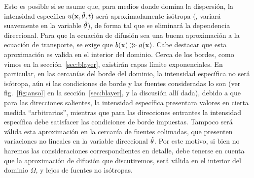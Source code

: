 Esto es posible si se asume que, para medios donde domina la dispersión, 
la intensidad específica $u(\mathbf{x},\hat{\theta},t)$ será aproximadamente 
isótropa (\ie, variará suavemente en la variable $\hat{\theta}$), 
de forma tal que se eliminará la dependencia direccional. Para que la 
ecuación de difusión sea una buena aproximación a la ecuación de 
transporte, se exige que $b(\mathbf{x})\gg a(\mathbf{x})$. Cabe destacar que esta aproximación 
es valida en el interior del dominio. Cerca de los bordes, como vimos en la sección~\ref{sec:blayer}, existirán capas límite exponenciales. 
En particular, en las cercanías del borde del dominio, la intensidad específica no será isótropa, 
aún si las condiciones de borde y las fuentes consideradas lo son (ver fig.~\ref{fig:ansol} 
en la sección~\ref{sec:blayer}, y la discusión allí dada), 
debido a que para las direcciones salientes, la intensidad específica 
presentara valores en cierta medida ``arbitrarios'', mientras que 
para las direcciones entrantes la intensidad específica debe satisfacer 
las condiciones de borde impuestas. Tampoco será válida esta 
aproximación en la cercanía de fuentes colimadas, que presenten variaciones no lineales en la variable 
direccional $\hat{\theta}$. Por este motivo, si bien no haremos las consideraciones correspondientes 
en detalle, debe tenerse en cuenta que la aproximación de difusión que discutiremos, 
será válida en el interior del dominio $\Omega$, y lejos de fuentes no isótropas. 

